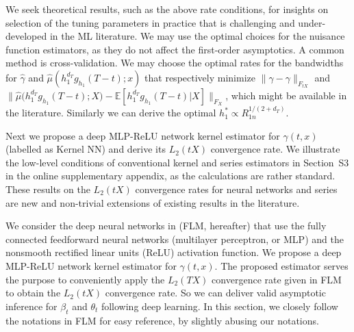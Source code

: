 \documentclass[lettersize, 12pt]{article}
\begin{document}
We seek theoretical results, such as the above rate conditions, for insights on selection of the tuning parameters in practice
 that is challenging and under-developed in the ML literature.
We may use the optimal choices for the nuisance function estimators, as they do not affect the first-order asymptotics.
A common method is cross-validation.
We may choose the optimal rates for the bandwidths for $\hat\gamma$ and $\hat\mu(h_1^{d_T}g_{h_1}(T-t); x)$  that respectively minimize $\|\hat\gamma-\gamma\|_{F_{tX}}$ and $\big\| \hat\mu\big(h_1^{d_T}g_{h_1}(T-t); X\big) - {\mathbb{E}}[h_1^{d_T}g_{h_1}(T-t)|X] \big\|_{F_X}$, which might be available in the literature. 
Similarly we can derive the optimal $h_1^\ast \propto R_{1n}^{1/(2+d_T)}$.
%

Next we propose a deep MLP-ReLU network kernel estimator for $\gamma(t, x)$ (labelled as Kernel NN) and derive its $L_2(tX)$ convergence rate.
We illustrate the low-level conditions of conventional kernel and series estimators in Section~S3 in the online supplementary appendix, as the calculations are rather standard.
These results on the $L_2(tX)$ convergence rates for neural networks and series are new and non-trivial extensions of existing results in the literature.


We consider the deep neural networks in \cite{Farrell18} (FLM, hereafter) that use the 
fully connected feedforward neural networks (multilayer perceptron, or MLP) and the nonsmooth rectified linear units (ReLU) activation function.
We propose a deep MLP-ReLU network kernel estimator for $\gamma(t, x)$.
The proposed estimator serves the purpose to conveniently apply the $L_2(TX)$ convergence rate given in FLM to obtain the $L_2(tX)$ convergence rate.
So we can deliver valid asymptotic inference for $\beta_t$ and $\theta_t$ following deep learning.  
In this section, we closely follow the notations in FLM for easy reference, by slightly abusing our notations.
\end{document}
